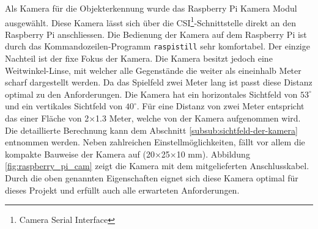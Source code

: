 Als Kamera für die Objekterkennung wurde das Raspberry Pi Kamera Modul ausgewählt. Diese Kamera lässt sich über die CSI\footnote{Camera Serial Interface}-Schnittstelle direkt an den Raspberry Pi anschliessen. Die Bedienung der Kamera auf dem Raspberry Pi ist durch das Kommandozeilen-Programm \verb|raspistill| sehr komfortabel. Der einzige Nachteil ist der fixe Fokus der Kamera. Die Kamera besitzt jedoch eine Weitwinkel-Linse, mit welcher alle Gegenstände die weiter als eineinhalb Meter scharf dargestellt werden. Da das Spielfeld zwei Meter lang ist passt diese Distanz optimal zu den Anforderungen. Die Kamera hat ein horizontales Sichtfeld von $53^\circ$ und ein vertikales Sichtfeld von $40^\circ$. Für eine Distanz von zwei Meter entspricht das einer Fläche von 2×1.3 Meter, welche von der Kamera aufgenommen wird. Die detaillierte Berechnung kann dem Abschnitt \ref{subsub:sichtfeld-der-kamera} entnommen werden. Neben zahlreichen Einstellmöglichkeiten, fällt vor allem die kompakte Bauweise der Kamera auf (20×25×10 mm). Abbildung \ref{fig:raspberry_pi_cam} zeigt die Kamera mit dem mitgelieferten Anschlusskabel. Durch die oben genannten Eigenschaften eignet sich diese Kamera optimal für dieses Projekt und erfüllt auch alle erwarteten Anforderungen.
